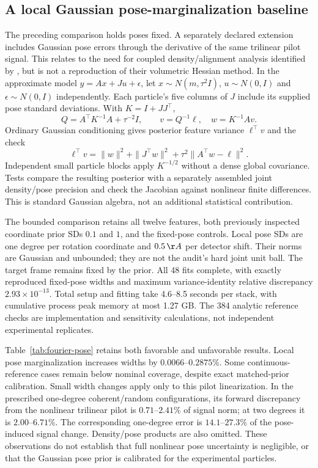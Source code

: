\subsection{A local Gaussian pose-marginalization baseline}
The preceding comparison holds poses fixed. A separately declared extension
includes Gaussian pose errors through the derivative of the same trilinear
pilot signal. This relates to the need for coupled density/alignment analysis
identified by \citet{rangan2024}, but is not a reproduction of their volumetric
Hessian method. In the approximate model
$y=Ax+Ju+\epsilon$, let $x\sim N(m,\tau^2I)$, $u\sim N(0,I)$ and
$\epsilon\sim N(0,I)$ independently. Each particle's five columns of $J$
include its supplied pose standard deviations. With $K=I+JJ^\top$,
\[
 Q=A^\top K^{-1}A+\tau^{-2}I,\qquad
 v=Q^{-1}\ell,\quad w=K^{-1}Av.
\]
Ordinary Gaussian conditioning gives posterior feature variance $\ell^\top v$
and the check
\[
 \ell^\top v=\|w\|^2+\|J^\top w\|^2
                 +\tau^2\|A^\top w-\ell\|^2.
\]
Independent small particle blocks apply $K^{-1/2}$ without a dense global
covariance. Tests compare the resulting posterior with a separately assembled
joint density/pose precision and check the Jacobian against nonlinear finite
differences. This is standard Gaussian algebra, not an additional statistical
contribution.

The bounded comparison retains all twelve features, both previously inspected
coordinate prior SDs $0.1$ and $1$, and the fixed-pose controls. Local pose SDs
are one degree per rotation coordinate and $0.5\,\AA$ per detector shift.
Their norms are Gaussian and unbounded; they are not the audit's hard joint
unit ball. The target frame remains fixed by the prior. All 48 fits complete,
with exactly reproduced fixed-pose widths and maximum variance-identity
relative discrepancy $2.93\times10^{-13}$. Total setup and fitting take
4.6--8.5 seconds per stack, with cumulative process peak memory at most
1.27 GB. The 384 analytic reference checks are implementation and sensitivity
calculations, not independent experimental replicates.

Table~\ref{tab:fourier-pose} retains both favorable and unfavorable results.
Local pose marginalization increases widths by $0.0066$--$0.2875\%$.
Some continuous-reference cases remain below nominal coverage, despite exact
matched-prior calibration. Small width changes apply only to this pilot
linearization. In the prescribed one-degree coherent/random configurations,
its forward discrepancy from the nonlinear trilinear pilot is
$0.71$--$2.41\%$ of signal norm; at two degrees it is $2.00$--$6.71\%$.
The corresponding one-degree error is $14.1$--$27.3\%$ of the pose-induced
signal change. Density/pose products are also omitted. These observations do
not establish that full nonlinear pose uncertainty is negligible, or that
the Gaussian pose prior is calibrated for the experimental particles.

